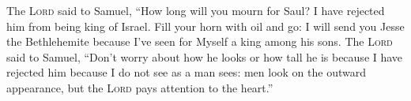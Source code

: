 
\begin{inparaenum}
     The \textsc{Lord} said to Samuel, ``How long will you mourn for Saul? I have rejected him from being king of Israel. Fill your horn with oil and go: I will send you Jesse the Bethlehemite because I've seen for Myself a king among his sons.%
     The \textsc{Lord} said to Samuel, ``Don't worry about how he looks or how tall he is because I have rejected him because I do not see as a man sees: men look on the outward appearance, but the \textsc{Lord} pays attention to the heart.''%
\end{inparaenum}
